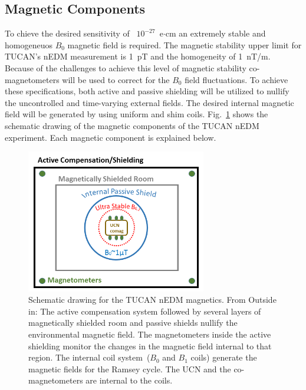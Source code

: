 



\subsection{Magnetic Components}
To chieve the desired sensitivity of ~$10^{-27}$~e$\cdot$cm an
extremely stable and homogeneuos $B_0$ magnetic field is required. The
magnetic stability upper limit for TUCAN's nEDM measurement is 1~pT
and the homogeneity of 1~nT/m. Because of the challenges to achieve
this level of magnetic stability co-magnetometers will be used to
correct for the $B_0$ field fluctuations. To achieve these
specifications, both active and passive shielding will be utilized to
nullify the uncontrolled and time-varying external fields. The desired
internal magnetic field will be generated by using uniform and shim
coils. Fig.~\ref{fig:magneticscheme} shows the schematic drawing of
the magnetic components of the TUCAN nEDM experiment. Each magnetic
component is explained below.

\begin{figure}[h!]
  \centering
  \includegraphics[width=0.7\textwidth]{magneticscheme.png}
  \caption{Schematic drawing for the TUCAN nEDM magnetics. From
    Outside in: The active compensation system followed by several
    layers of magnetically shielded room and passive shields nullify
    the environmental magnetic field. The magnetometers inside the
    active shielding monitor the changes in the magnetic field
    internal to that region. The internal coil system~($B_0$ and $B_1$
    coils) generate the magnetic fields for the Ramsey cycle. The UCN
    and the co-magnetometers are internal to the coils.  }
  \label{fig:magneticscheme}
\end{figure}



